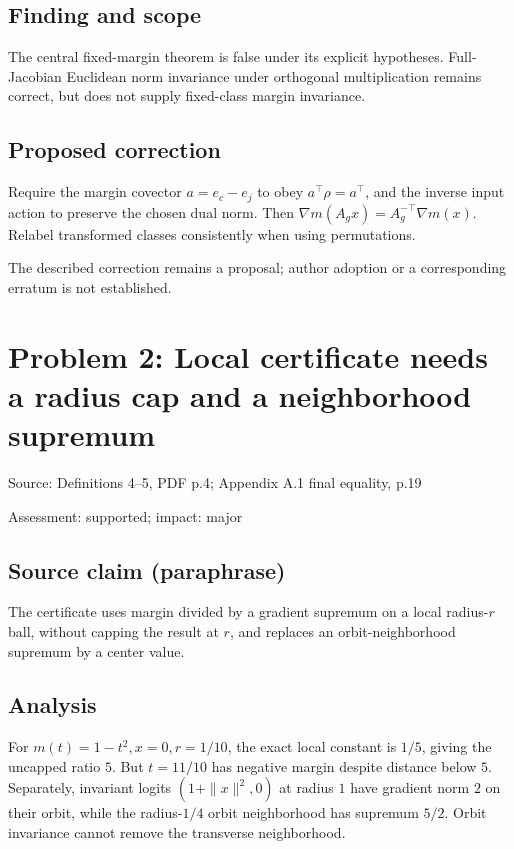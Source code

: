 \documentclass[11pt]{article}
\begin{document}
\subsection*{Finding and scope}

The central fixed-margin theorem is false under its explicit hypotheses. Full-Jacobian Euclidean norm invariance under orthogonal multiplication remains correct, but does not supply fixed-class margin invariance.

\subsection*{Proposed correction}

Require the margin covector \(a=e_c-e_j\) to obey \(a^\top\rho=a^\top\), and the inverse input action to preserve the chosen dual norm. Then \(\nabla m(A_gx)=A_g^{-\top}\nabla m(x)\). Relabel transformed classes consistently when using permutations.

The described correction remains a proposal; author adoption or a corresponding erratum is not established.

\section*{Problem 2: Local certificate needs a radius cap and a neighborhood supremum}

Source: Definitions 4–5, PDF p.4; Appendix A.1 final equality, p.19

Assessment: supported; impact: major

\subsection*{Source claim (paraphrase)}

The certificate uses margin divided by a gradient supremum on a local radius-\(r\) ball, without capping the result at \(r\), and replaces an orbit-neighborhood supremum by a center value.

\subsection*{Analysis}

For \(m(t)=1-t^2,x=0,r=1/10\), the exact local constant is \(1/5\), giving the uncapped ratio \(5\). But \(t=11/10\) has negative margin despite distance below \(5\). Separately, invariant logits \((1+\|x\|^2,0)\) at radius \(1\) have gradient norm \(2\) on their orbit, while the radius-\(1/4\) orbit neighborhood has supremum \(5/2\). Orbit invariance cannot remove the transverse neighborhood.
\end{document}
